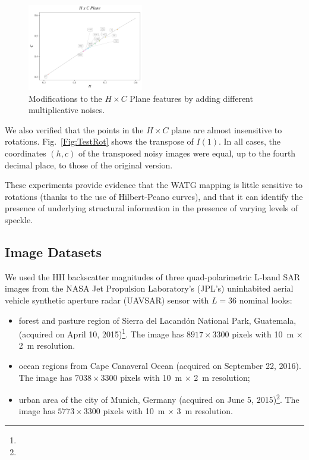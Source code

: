 \documentclass[journal]{IEEEtran}
\begin{document}
\begin{figure}
	\includegraphics[width=0.45\textwidth]{Figures/waves1.pdf}
	\caption{Modifications to the $H \times C$ Plane features by adding different multiplicative noises.}
	\label{Fig:TestSpeckleHC}
\end{figure}

We also verified that the points in the $H\times C$ plane are almost insensitive to rotations.
Fig.~\ref{Fig:TestRot} shows the transpose of $I(1)$.
In all cases, the coordinates $(h,c)$ of the transposed noisy images were equal, up to the fourth decimal place, to those of the original version.

These experiments provide evidence that the WATG mapping is little sensitive to rotations (thanks to the use of Hilbert-Peano curves), and that it can identify the presence of underlying structural information in the presence of varying levels of speckle.

\subsection{Image Datasets}

We used the HH backscatter magnitudes of three quad-polarimetric L-band SAR images from the NASA Jet Propulsion Laboratory’s (JPL’s) uninhabited aerial vehicle synthetic aperture radar (UAVSAR) sensor with $L=36$ nominal looks:
\begin{itemize}
	\item forest and pasture region of Sierra del Lacandón National Park, Guatemala, (acquired on April 10, 2015)\footnote{}. 
	The image has $8917 \times 3300$ pixels with 
	\SI[inter-unit-product =$\cdot$]{10}{\meter} $\times$ \SI[inter-unit-product =$\cdot$]{2}{\meter} resolution.
	\item ocean regions from Cape Canaveral Ocean (acquired on September 22, 2016).
	The image has $7038 \times 3300$ pixels with 
	\SI[inter-unit-product =$\cdot$]{10}{\meter} $\times$ \SI[inter-unit-product =$\cdot$]{2}{\meter} resolution;
	\item urban area of the city of Munich, Germany (acquired on June 5, 2015)\footnote{}.
	The image has $5773 \times 3300$ pixels with 
	\SI[inter-unit-product =$\cdot$]{10}{\meter} $\times$ \SI[inter-unit-product =$\cdot$]{3}{\meter} resolution.
\end{itemize}
\end{document}
